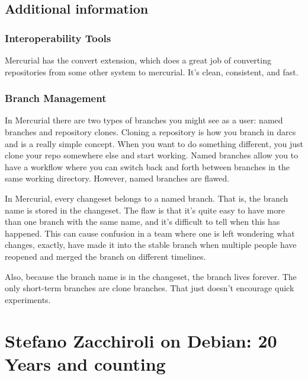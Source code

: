 \documentclass[11pt]{article}
\begin{document}
\subsection{Additional information}
\subsubsection* {Interoperability Tools}
Mercurial has the convert extension, which does a great job of converting repositories from some other system to mercurial. It's clean, consistent, and fast.
\subsubsection*{ Branch Management}

In Mercurial there are two types of branches you might see as a user: named branches and repository clones. Cloning a repository is how you branch in darcs and is a really simple concept. When you want to do something different, you just clone your repo somewhere else and start working. Named branches allow you to have a workflow where you can switch back and forth between branches in the same working directory. However, named branches are flawed.

In Mercurial, every changeset belongs to a named branch. That is, the branch name is stored in the changeset. The flaw is that it's quite easy to have more than one branch with the same name, and it's difficult to tell when this has happened. This can cause confusion in a team where one is left wondering what changes, exactly, have made it into the stable branch when multiple people have reopened and merged the branch on different timelines.

Also, because the branch name is in the changeset, the branch lives forever. The only short-term branches are clone branches. That just doesn't encourage quick experiments.



\newpage

\section{Stefano Zacchiroli on Debian: 20 Years and counting}
\end{document}
